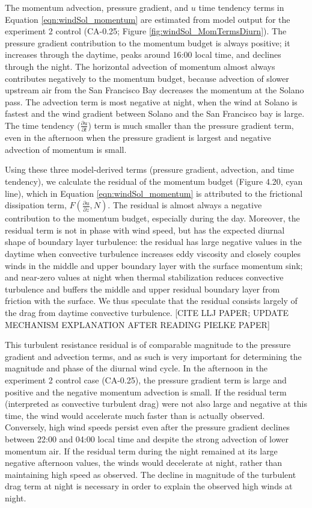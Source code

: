 The momentum advection, pressure gradient, and $u$ time tendency terms in Equation \ref{eqn:windSol_momentum} are estimated from model output for the experiment 2 control (CA-0.25; Figure \ref{fig:windSol_MomTermsDiurn}).  The pressure gradient contribution to the momentum budget is always positive; it increases through the daytime, peaks around 16:00 local time, and declines through the night.  The horizontal advection of momentum almost always contributes negatively to the momentum budget, because advection of slower upstream air from the San Francisco Bay decreases the momentum at the Solano pass.  The advection term is most negative at night, when the wind at Solano is fastest and the wind gradient between Solano and the San Francisco bay is large. The time tendency ($\frac{\partial u}{\partial t}$) term is much smaller than the pressure gradient term, even in the afternoon when the pressure gradient is largest and negative advection of momentum is small.

Using these three model-derived terms (pressure gradient, advection, and time tendency), we calculate the residual of the momentum budget (Figure  4.20, cyan line), which in Equation \ref{eqn:windSol_momentum} is attributed to the frictional dissipation term, $F\left(\frac{\partial u}{\partial z}, N\right)$. The residual is almost always a negative contribution to the momentum budget, especially during the day.  Moreover, the residual term is not in phase with wind speed, but has the expected diurnal shape of boundary layer turbulence: the residual has large negative values in the daytime when convective turbulence increases eddy viscosity and closely couples winds in the middle and upper boundary layer with the surface momentum sink; and near-zero values at night when thermal stabilization reduces convective turbulence and buffers the middle and upper residual boundary layer from friction with the surface.  We thus speculate that the residual consists largely of the drag from daytime convective turbulence.  [CITE LLJ PAPER; UPDATE MECHANISM EXPLANATION AFTER READING PIELKE PAPER]  

This turbulent resistance residual is of comparable magnitude to the pressure gradient and advection terms, and as such is very important for determining the magnitude and phase of the diurnal wind cycle.  In the afternoon in the experiment 2 control case (CA-0.25), the pressure gradient term is large and positive and the negative momentum advection is small.  If the residual term (interpreted as convective turbulent drag) were not also large and negative at this time, the wind would accelerate much faster than is actually observed.  Conversely, high wind speeds persist even after the pressure gradient declines between 22:00 and 04:00 local time and despite the strong advection of lower momentum air.  If the residual term during the night remained at its large negative afternoon  values, the winds would decelerate at night, rather than maintaining high speed as observed.  The decline in magnitude of the turbulent drag term at night is necessary in order to explain the observed high winds at night.

